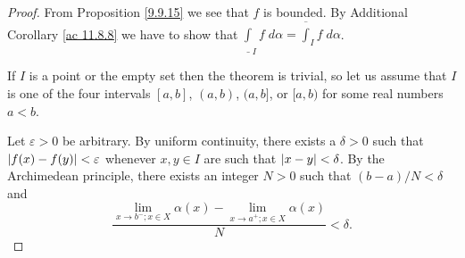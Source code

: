 \begin{proof}
    From Proposition \ref{9.9.15} we see that \(f\) is bounded.
    By Additional Corollary \ref{ac 11.8.8} we have to show that \(\underline{\int}_I f \; d \alpha = \overline{\int}_I f \; d \alpha\).

    If \(I\) is a point or the empty set then the theorem is trivial, so let us assume that \(I\) is one of the four intervals \([a, b]\), \((a, b)\), \((a, b]\), or \([a, b)\) for some real numbers \(a < b\).

    Let \(\varepsilon > 0\) be arbitrary.
    By uniform continuity, there exists a \(\delta > 0\) such that \(\abs*{f(x) - f(y)} < \varepsilon\) whenever \(x, y \in I\) are such that \(\abs*{x - y} < \delta\).
    By the Archimedean principle, there exists an integer \(N > 0\) such that \((b - a) / N < \delta\) and
    \[
        \frac{\lim_{x \to b^- ; x \in X} \alpha(x) - \lim_{x \to a^+ ; x \in X} \alpha(x)}{N} < \delta.
    \]


\end{proof}

